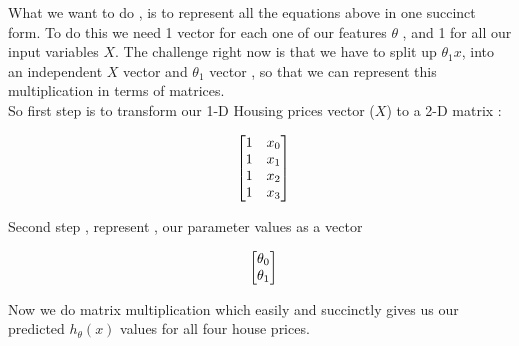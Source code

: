 What we want to do , is to represent all the equations above in one succinct
form. To do this we need 1 vector for each one of our features \( \theta \) ,
and 1 for all our input variables \( X \). The challenge right now is that we
have to split up \( \theta_{1}x \), into an independent \( X \) vector and \(
	\theta_1 \) vector , so that we can represent this multiplication in terms
of matrices.\\

So first step is to transform our 1-D Housing prices vector (\( X \)) to a 2-D
matrix  :

\[
\begin{array}{ l@{} l@{} l@{} l@{} l@{}} 
\begin{bmatrix}
	1 & x_0 \\
	1 & x_1 \\
	1 & x_2 \\
	1 & x_3 \\
\end{bmatrix}

\end{array}
\]

Second step , represent , our parameter values as a vector

\[
	\begin{array}{ l@{} l@{} }
		\begin{bmatrix}
			\theta_0 \\
			\theta_1 \\
		\end{bmatrix} 
	\end{array}
\]

Now we do matrix multiplication which easily and succinctly gives us our
predicted $ h_{\theta}(x) $ values for all four house prices.

